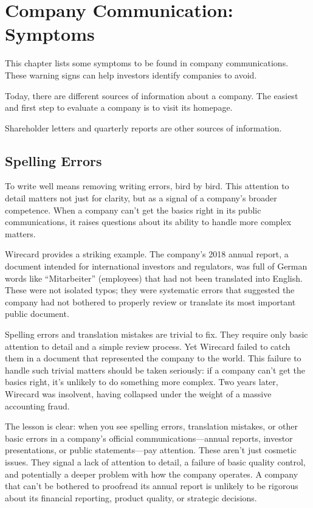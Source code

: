 \chapter{Company Communication: Symptoms}

This chapter lists some symptoms to be found in company communications. These warning signs can help investors identify companies to avoid.

Today, there are different sources of information about a company. The easiest 
and first step to evaluate a company is to visit its homepage. 

Shareholder letters and quarterly reports are other sources of information.

\section{Spelling Errors}

To write well means removing writing errors, bird by bird. This attention to detail matters not just for clarity, but as a signal of a company's broader competence. When a company can't get the basics right in its public communications, it raises questions about its ability to handle more complex matters.

Wirecard provides a striking example. The company's 2018 annual report, a document intended for international investors and regulators, was full of German words like ``Mitarbeiter'' (employees) that had not been translated into English. These were not isolated typos; they were systematic errors that suggested the company had not bothered to properly review or translate its most important public document.

Spelling errors and translation mistakes are trivial to fix. They require only basic attention to detail and a simple review process. Yet Wirecard failed to catch them in a document that represented the company to the world. This failure to handle such trivial matters should be taken seriously: if a company can't get the basics right, it's unlikely to do something more complex. Two years later, Wirecard was insolvent, having collapsed under the weight of a massive accounting fraud.

The lesson is clear: when you see spelling errors, translation mistakes, or other basic errors in a company's official communications—annual reports, investor presentations, or public statements—pay attention. These aren't just cosmetic issues. They signal a lack of attention to detail, a failure of basic quality control, and potentially a deeper problem with how the company operates. A company that can't be bothered to proofread its annual report is unlikely to be rigorous about its financial reporting, product quality, or strategic decisions.

